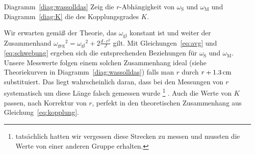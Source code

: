 Diagramm~\ref{diag:wassolldas} Zeig die $r$-Abhängigkeit von $\omega_\mathrm{S}$ und $\omega_\mathrm{M}$ und Diagramm~\ref{diag:K} die des Kopplungsgrades $K$.

Wir erwarten gemäß der Theorie, das $\omega_\mathrm{gl}$ konstant ist und weiter der Zusammenhand ${\omega_\mathrm{geg}}^2 = {\omega_\mathrm{gl}}^2 + 2 \frac{d \cdot r^2}{J}$ gilt. Mit Gleichungen~\ref{eq:avg} und \ref{eq:schwebung} ergeben sich die entsprechenden Beziehungen für $\omega_\mathrm{S}$ und $\omega_\mathrm{M}$. Unsere Messwerte folgen einem solchen Zusammenhang ideal (siehe Theoriekurven in Diagramm~\ref{diag:wassolldas}) falls man $r$ durch $r + \unit[1.3]{cm}$ substituiert. Das liegt wahrscheinlich daran, dass bei den Messungen von $r$ systematisch um diese Länge falsch gemessen wurde%
\footnote{tatsächlich hatten wir vergessen diese Strecken zu messen und mussten die Werte von einer anderen Gruppe erhalten.}%
.
Auch die Werte von $K$ passen, nach Korrektur von $r$, perfekt in den theoretischen Zusammenhang aus Gleichung~\ref{eq:kopplung}.














